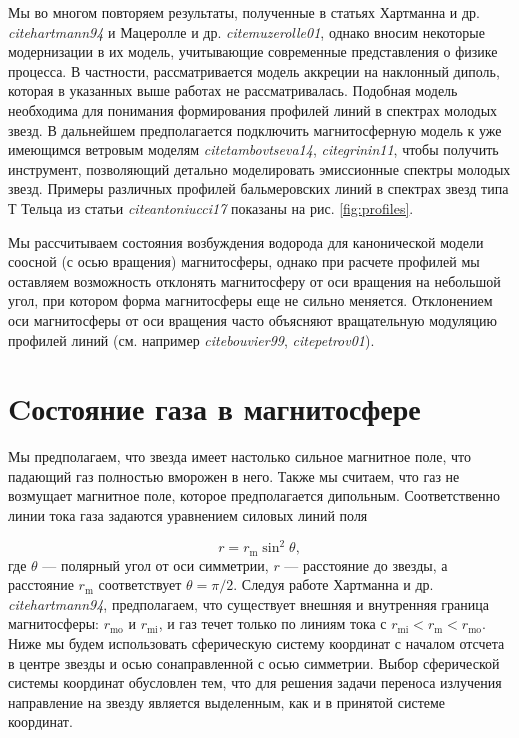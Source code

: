 \documentclass{article}
\begin{document}
Мы во многом повторяем результаты, полученные в статьях Хартманна и др. \textit{cite{hartmann94}} и Мацеролле и др. \textit{cite{muzerolle01}}, однако вносим некоторые модернизации в их модель, учитывающие современные представления о физике процесса. В частности, рассматривается модель аккреции на наклонный диполь, которая в указанных выше работах не рассматривалась. Подобная модель необходима для понимания формирования профилей линий в спектрах молодых звезд. В дальнейшем предполагается подключить магнитосферную модель к уже имеющимся ветровым моделям \textit{cite{tambovtseva14}}, \textit{cite{grinin11}}, чтобы получить инструмент, позволяющий детально моделировать эмиссионные спектры молодых звезд. Примеры различных профилей бальмеровских линий в спектрах звезд типа Т Тельца из статьи \textit{cite{antoniucci17}} показаны на рис. \ref{fig:profiles}.

Мы рассчитываем состояния возбуждения водорода для канонической модели соосной (с осью вращения) магнитосферы, однако при расчете профилей мы оставляем возможность отклонять магнитосферу от оси вращения на небольшой угол, при котором форма магнитосферы еще не сильно меняется. Отклонением оси магнитосферы от оси вращения часто объясняют вращательную модуляцию профилей линий (см. например \textit{cite{bouvier99}}, \textit{cite{petrov01}}).

\section{Cостояние газа в магнитосфере}

Мы предполагаем, что звезда имеет настолько сильное магнитное поле, что падающий газ полностью вморожен в него. Также мы считаем, что газ не возмущает магнитное поле, которое предполагается дипольным. Соответственно линии тока газа задаются уравнением силовых линий поля

\begin{equation} \label{eq:dipole}
r = r_\text{m} \sin^2 \theta,
\end{equation}
где $\theta$ --- полярный угол от оси симметрии, $r$ --- расстояние до звезды, а расстояние $r_\text{m}$ соответствует $\theta = \pi/2$. Следуя работе Хартманна и др. \textit{cite{hartmann94}}, предполагаем, что существует внешняя и внутренняя граница магнитосферы: $r_\text{mo}$ и $r_\text{mi}$, и газ течет только по линиям тока с $r_\text{mi} < r_\text{m} < r_\text{mo}$. Ниже мы будем использовать сферическую систему координат с началом отсчета в центре звезды и осью сонаправленной с осью симметрии. Выбор сферической системы координат обусловлен тем, что для решения задачи переноса излучения направление на звезду является выделенным, как и в принятой системе координат.
\end{document}
